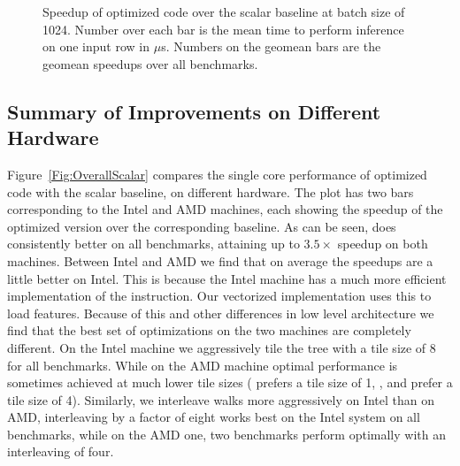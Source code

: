 \begin{figure}[tbp]
  \centering
  \caption{Speedup of \Treebeard{} optimized code over the scalar baseline 
           at batch size of 1024. Number over each bar is the mean time to 
           perform inference on one input row in $\mu$s. Numbers on the geomean bars 
           are the geomean speedups over all benchmarks.}
  \label{fig:Summary}
\end{figure}

\subsection{Summary of Improvements on Different Hardware}
Figure~\ref{Fig:OverallScalar} compares the single core performance of \Treebeard{} optimized code with the scalar baseline, on different hardware. The plot has two bars corresponding to the Intel and AMD machines,
each showing the speedup of the optimized version over the corresponding baseline.
As can be seen, \Treebeard{} does consistently better on all benchmarks, attaining up to $3.5\times$ speedup on both machines.
Between Intel and AMD we find that on average the speedups are a little better on Intel. This is because the Intel machine has a much
more efficient implementation of the  instruction. Our vectorized implementation uses this to load features.
Because of this and other differences in low level architecture we find that the best set of optimizations on the two machines are completely different. On the
Intel machine we aggressively tile the tree with a tile size of 8 for all benchmarks. While on the AMD machine optimal
performance is sometimes achieved at much lower tile sizes ( prefers a tile size of 1,
,  and  prefer a tile size of 4). Similarly, we interleave walks more aggressively
on Intel than on AMD, interleaving by a factor of eight works best on the Intel
system on all benchmarks, while on the AMD one, two benchmarks perform optimally
with an interleaving of four.

